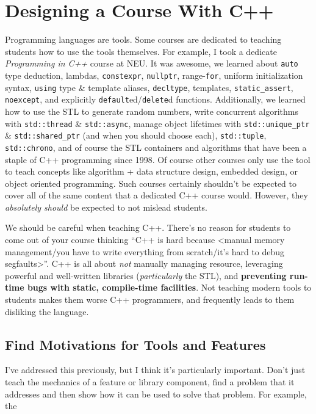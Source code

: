\documentclass{article}
\begin{document}
\section*{Designing a Course With C++}
Programming languages are tools.  Some courses are dedicated to teaching students how to use the tools themselves. For example, I took a dedicate \emph{Programming in C++} course at NEU.  It was awesome, we learned about \lstinline{auto} type deduction, lambdas, \lstinline{constexpr}, \lstinline{nullptr}, range-\lstinline{for}, uniform initialization syntax, \lstinline{using} type \& template aliases, \lstinline{decltype}, templates, \lstinline{static_assert}, \lstinline{noexcept}, and explicitly \lstinline{default}ed/\lstinline{delete}d functions.  Additionally, we learned how to use the STL to generate random numbers, write concurrent algorithms with \lstinline{std::thread} \& \lstinline{std::async}, manage object lifetimes with \lstinline{std::unique_ptr} \& \lstinline{std::shared_ptr} (and when you should choose each), \lstinline{std::tuple}, \lstinline{std::chrono}, and of course the STL containers and algorithms that have been a staple of C++ programming since 1998.  Of course other courses only use the tool to teach concepts like algorithm + data structure design, embedded design, or object oriented programming.  Such courses certainly shouldn't be expected to cover all of the same content that a dedicated C++ course would.  However, they \emph{absolutely should} be expected to not mislead students.

We should be careful when teaching C++.  There's no reason for students to come out of your course thinking ``C++ is hard because <manual memory management/you have to write everything from scratch/it's hard to debug segfaults>''.  C++ is all about \emph{not} manually managing resource, leveraging powerful and well-written libraries (\emph{particularly} the STL), and \textbf{preventing run-time bugs with static, compile-time facilities}.  Not teaching modern tools to students makes them worse C++ programmers, and frequently leads to them disliking the language.  

\subsection*{Find Motivations for Tools and Features}
I've addressed this previously, but I think it's particularly important.  Don't just teach the mechanics of a feature or library component, find a problem that it addresses and then show how it can be used to solve that problem.  For example, the 
\end{document}
